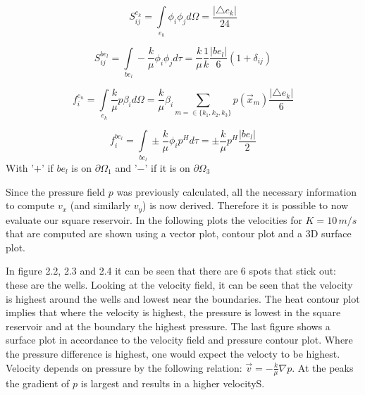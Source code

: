 \documentclass[a4paper]{report}
\begin{document}
\begin{equation}
S^{e_k}_{ij}=\int\limits_{e_k}\phi_i\phi_j d\Omega= \frac{\lvert\triangle e_k \rvert}{24}
\end{equation}

\begin{equation}
S^{be_l}_{ij}=\int\limits_{be_l}-\frac{k}{\mu}\phi_i\phi_j d\tau = \frac{k}{\mu}\frac{1}{k}\frac{\lvert be_l\rvert}{6}(1+\delta_{ij})
\end{equation}

\begin{equation}
f^{e_n}_{i} = \int\limits_{e_k}\frac{k}{\mu}p\beta_i d\Omega = \frac{k}{\mu}\beta_i\sum_{m=\in\{k_1,k_2,k_3\}} p(\vec{x}_m) \frac{\lvert \triangle e_k\rvert}{6}
\end{equation}

\begin{equation}
f^{be_l}_{i}=\int\limits_{be_l}\pm \frac{k}{\mu}\phi_ip^H d\tau = \pm \frac{k}{\mu}p^H \frac{\lvert be_l\rvert}{2}
\end{equation}
With '$+$' if $be_{l}$ is on $\partial\Omega_1$ and '$-$' if it is on $\partial\Omega_3$
\vspace{5mm}

Since the pressure field $p$ was previously calculated, all the necessary information to compute $v_x$ (and similarly $v_y$) is now derived. Therefore it is possible to now evaluate our square reservoir. In the following plots the velocities for $K=10\,m/s$ that are computed are shown using a vector plot, contour plot and a 3D surface plot.\par In figure 2.2, 2.3 and 2.4 it can be seen that there are 6 spots that stick out: these are the wells. Looking at the velocity field, it can be seen that the velocity is highest around the wells and lowest near the boundaries. The heat contour plot implies that where the velocity is highest, the pressure is lowest in the square reservoir and at the boundary the highest pressure. The last figure shows a surface plot in accordance to the velocity field and pressure contour plot. Where the pressure difference is highest, one would expect the velocty to be highest. Velocity depends on pressure by the following relation: $\vec{v}=-\frac{k}{\mu}\nabla p$. At the peaks the gradient of $p$ is largest and results in a higher velocityS.
\end{document}
